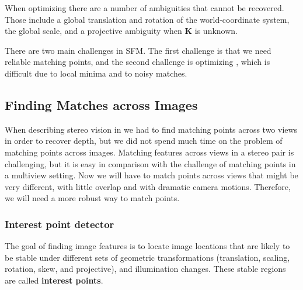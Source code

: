 
When optimizing \eqn{\ref{eq:final_reprojection_error}} there are a number of ambiguities that cannot be recovered. Those include a global translation and rotation of the world-coordinate system, the global scale, and a projective ambiguity when $\mathbf{K}$ is unknown.



There are two main challenges in SFM. The first challenge is that we need reliable matching points, and the second challenge is optimizing \eqn{\ref{eq:final_reprojection_error}}, which is difficult due to local minima and to noisy matches.


\subsection{Finding Matches across Images}

When describing stereo vision in \chap{\ref{chap:stereo_vision}} we had to find matching points across two views in order to recover depth, but we did not spend much time on the problem of matching points across images. Matching features across views in a stereo pair is challenging, but it is easy in comparison with the challenge of matching points in a multiview setting. Now we will have to match points across views that might be very different, with little overlap and with dramatic camera motions. Therefore, we will need a more robust way to match points.


\subsubsection{Interest point detector}

The goal of finding image features is to locate image locations that are likely to be stable under different sets of geometric transformations (translation, scaling, rotation, skew, and projective), and illumination changes. These stable regions are called {\bf interest points}. 

